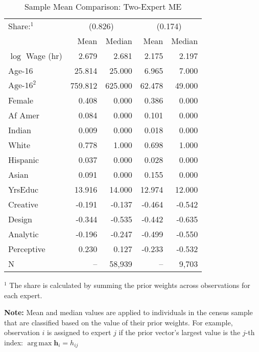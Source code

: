 \documentclass[12pt]{article}
\DeclareMathOperator*{\argmax}{arg\,max}
\theoremstyle{definition}
\begin{document}
  
  \begin{table} \centering
    \caption{Sample Mean Comparison: Two-Expert ME}
    \begin{threeparttable}
      \begin{tabular}[l]{l r r r r}
    \cmidrule{1-5}
    Share:$^{1}$& \multicolumn{2}{c}{(0.826)} & \multicolumn{2}{c}{(0.174)} \\
                & Mean & Median & Mean & Median \\
    \cmidrule{1-5}
    $\log$ Wage (hr)      &   2.679 &   2.681 &  2.175 &  2.197 \\
    Age-16                &  25.814 &  25.000 &  6.965 &  7.000 \\
    $\textrm{Age-16}^{2}$ & 759.812 & 625.000 & 62.478 & 49.000 \\
    Female                &   0.408 &   0.000 &  0.386 &  0.000 \\
    Af Amer               &   0.084 &   0.000 &  0.101 &  0.000 \\
    Indian                &   0.009 &   0.000 &  0.018 &  0.000 \\
    White                 &   0.778 &   1.000 &  0.698 &  1.000 \\
    Hispanic              &   0.037 &   0.000 &  0.028 &  0.000 \\
    Asian                 &   0.091 &   0.000 &  0.155 &  0.000 \\
    YrsEduc               &  13.916 &  14.000 & 12.974 & 12.000 \\
    Creative              &  -0.191 &  -0.137 & -0.464 & -0.542 \\
    Design                &  -0.344 &  -0.535 & -0.442 & -0.635 \\
    Analytic              &  -0.196 &  -0.247 & -0.499 & -0.550 \\
    Perceptive            &   0.230 &   0.127 & -0.233 & -0.532 \\
    \cmidrule{1-5}
    N                     &      -- &  58,939 &     -- &  9,703 \\
    \hline
      \end{tabular}
      \begin{tablenotes}
        \item{\footnotesize $^{1}$ The share is calculated by summing the 
        prior weights across observations for each expert.}
        \item{\footnotesize \textbf{Note:} Mean and median values are applied to individuals in the census sample that are classified based on the value of their prior weights. For example, observation $i$ is assigned to expert $j$ if the prior vector's largest value is the $j$-th index: $\argmax \boldsymbol{h}_{i} = h_{ij}$}
      \end{tablenotes} \label{tbl:ME2_sample_comparison}
    \end{threeparttable}
  \end{table}
  
\end{document}
